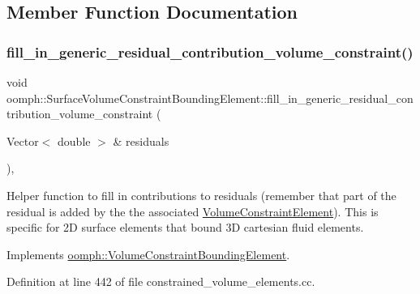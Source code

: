 \subsection{Member Function Documentation}
\mbox{\label{classoomph_1_1SurfaceVolumeConstraintBoundingElement_a5813fa65063eb55a5b264539d77cac88}} 
\subsubsection{\texorpdfstring{fill\+\_\+in\+\_\+generic\+\_\+residual\+\_\+contribution\+\_\+volume\+\_\+constraint()}{fill\_in\_generic\_residual\_contribution\_volume\_constraint()}}
{\footnotesize\ttfamily void oomph\+::\+Surface\+Volume\+Constraint\+Bounding\+Element\+::fill\+\_\+in\+\_\+generic\+\_\+residual\+\_\+contribution\+\_\+volume\+\_\+constraint (\begin{DoxyParamCaption}\item[{Vector$<$ double $>$ \&}]{residuals }\end{DoxyParamCaption})\hspace{0.3cm}{\ttfamily [protected]}, {\ttfamily [virtual]}}



Helper function to fill in contributions to residuals (remember that part of the residual is added by the the associated \hyperlink{classoomph_1_1VolumeConstraintElement}{Volume\+Constraint\+Element}). This is specific for 2D surface elements that bound 3D cartesian fluid elements. 



Implements \hyperlink{classoomph_1_1VolumeConstraintBoundingElement_a717f1085709bd8820b8043ff94ecb0c5}{oomph\+::\+Volume\+Constraint\+Bounding\+Element}.



Definition at line 442 of file constrained\+\_\+volume\+\_\+elements.\+cc.



